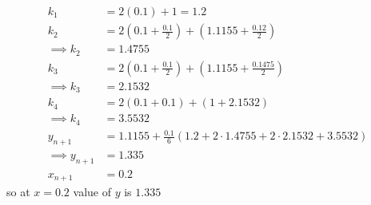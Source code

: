 \documentclass[journal,12pt,twocolumn]{IEEEtran}
\theoremstyle{remark}
\begin{document}
\begin{align}
    k_1&=2(0.1)+1=1.2\\
    k_2&=2(0.1+\frac{0.1}{2})+(1.1155+\frac{0.12}{2})\\
    \implies k_2&= 1.4755\\
    k_3&=2(0.1+\frac{0.1}{2})+(1.1155+\frac{0.1475}{2})\\
    \implies k_3&=2.1532\\
    k_4&=2(0.1+0.1)+(1+2.1532)\\
    \implies k_4&=3.5532\\
     y_{n+1}&=1.1155+\frac{0.1}{6}(1.2+2\cdot1.4755+2\cdot2.1532+3.5532)\\
     \implies y_{n+1}&=1.335\\
     x_{n+1}&=0.2
\end{align}
so at $x=0.2$ value of $y$ is $1.335$
\end{document}
